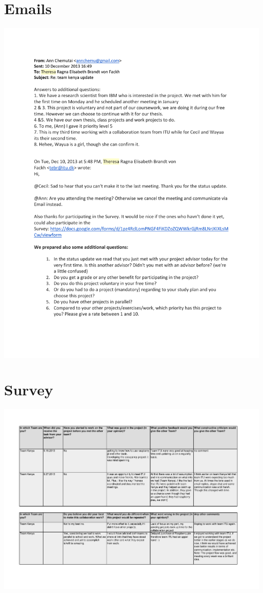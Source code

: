 \section{Emails} \label{sec:Emails}
\includegraphics[scale=0.75]{appendix/Email_20131210.pdf}

\section{Survey}\label{sec:survey_result}
\includegraphics[scale=0.75,angle=90]{appendix/Survey_Answers_from_Team_Kenya.pdf}